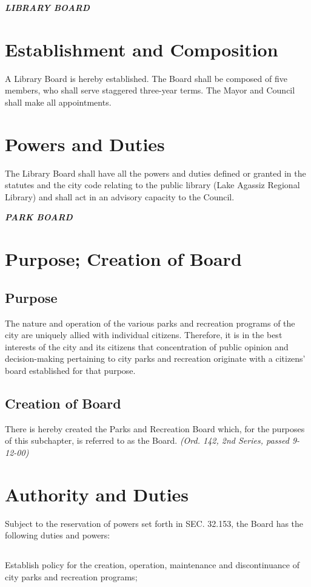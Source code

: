 \centerline{\textbf{\emph{\LARGE{LIBRARY BOARD}}}}
\setcounter{section}{139}
\section{Establishment and Composition}
A Library Board is hereby established. The Board shall be composed of five members, who shall serve staggered three-year terms. The Mayor and Council shall make all appointments.
\section{Powers and Duties}
The Library Board shall have all the powers and duties defined or granted in the statutes and the city code relating to the public library (Lake Agassiz Regional Library) and shall act in an advisory capacity to the Council.\newline

\centerline{\textbf{\emph{\LARGE{PARK BOARD}}}}
\setcounter{section}{149}
\section{Purpose; Creation of Board}
\subsection{Purpose}
The nature and operation of the various parks and recreation programs of the city are uniquely allied with individual citizens. Therefore, it is in the best interests of the city and its citizens that concentration of public opinion and decision-making pertaining to city parks and recreation originate with a citizens’ board established for that purpose.
\subsection{Creation of Board}
There is hereby created the Parks and Recreation Board which, for the purposes of this subchapter, is referred to as the Board.\newline
\emph{(Ord. 142, 2nd Series, passed 9-12-00)}
\section{Authority and Duties}
Subject to the reservation of powers set forth in SEC. 32.153, the Board has the following duties and powers:
\subsection{}
Establish policy for the creation, operation, maintenance and discontinuance of city parks and recreation programs;
